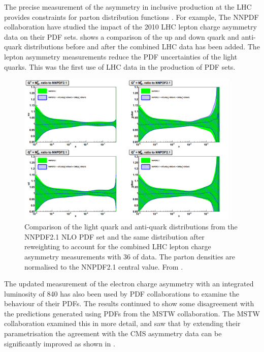 The precise measurement of the asymmetry in inclusive \PW production at the LHC
provides constraints for parton distribution functions \cite{asym840}.  For
example, The NNPDF collaboration \cite{Lionetti:2011pw} have studied the impact
of the 2010 LHC \PW lepton charge asymmetry data on their PDF sets\cite{Ball:2011gg}.
 shows a comparison of the up and down quark and
anti-quark distributions before and after the combined LHC data has been
added\cite{Ball:2011gg}.  The lepton asymmetry measurements reduce the PDF
uncertainties of the light quarks. This was the first use of LHC data in
the production of PDF sets. 

\begin{figure}[htbp]
  \begin{center}
  \includegraphics*[width=0.95\textwidth]{nnpdf_better}
  \caption[Comparison of the light quark and anti-quark distributions from the
NNPDF2.1 NLO PDF set and the same distribution after reweighting to account for
the LHC lepton charge asymmetry measurements with \unit{36}{\invpb} of data.]
{Comparison of the light quark and anti-quark distributions from the NNPDF2.1
NLO PDF set and the same distribution after reweighting to account for the
combined LHC lepton charge asymmetry measurements with \unit{36}{\invpb} of
data.  The parton densities are normalised to the NNPDF2.1 central value.  From
\cite{Ball:2011gg}. } \label{fig:effect}
  \end{center}
\end{figure}

The updated measurement of the electron charge asymmetry with an integrated
luminosity of \unit{840}{\invpb} has also been used by PDF collaborations to
examine the behaviour of their PDFs.  The results continued to show some
disagreement with the predictions generated using PDFs from the MSTW
collaboration.  The MSTW collaboration examined this in more
detail\cite{martin2013extended}, and saw that by extending their
parametrisation the agreement with the CMS asymmetry data can be significantly
improved as shown in .

